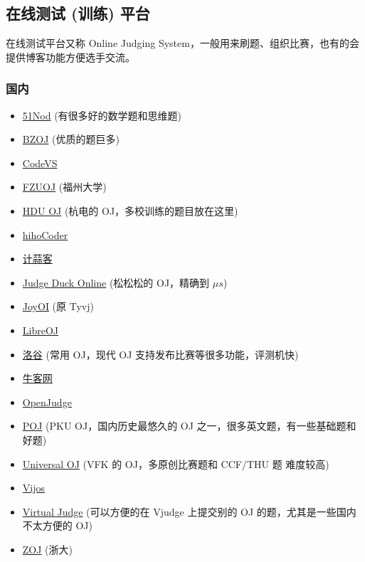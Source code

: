 
\subsection{在线测试 (训练) 平台}

在线测试平台又称 Online Judging System，一般用来刷题、组织比赛，也有的会提供博客功能方便选手交流。

\subsubsection{国内}

\begin{itemize}
\item \href{https://www.51nod.com/}{51Nod} (有很多好的数学题和思维题)
\item \href{https://www.lydsy.com/JudgeOnline/}{BZOJ} (优质的题巨多)
\item \href{http://www.codevs.cn/}{CodeVS}
\item \href{http://acm.fzu.edu.cn/}{FZUOJ} (福州大学)
\item \href{http://acm.hdu.edu.cn/}{HDU OJ} (杭电的 OJ，多校训练的题目放在这里)
\item \href{https://hihocoder.com/}{hihoCoder}
\item \href{https://www.jisuanke.com/}{计蒜客}
\item \href{https://duck.ac/}{Judge Duck Online} (松松松的 OJ，精确到 $\mu s$)
\item \href{http://www.joyoi.cn/}{JoyOI} (原 Tyvj)
\item \href{https://loj.ac/}{LibreOJ}
\item \href{http://www.luogu.org/}{洛谷} (常用 OJ，现代 OJ 支持发布比赛等很多功能，评测机快)
\item \href{https://www.nowcoder.com/}{牛客网}
\item \href{http://openjudge.cn/}{OpenJudge}
\item \href{http://poj.org/}{POJ} (PKU OJ，国内历史最悠久的 OJ 之一，很多英文题，有一些基础题和好题)
\item \href{http://uoj.ac/}{Universal OJ} (VFK 的 OJ，多原创比赛题和 CCF/THU 题 难度较高)
\item \href{https://vijos.org/}{Vijos}
\item \href{https://vjudge.net/}{Virtual Judge} (可以方便的在 Vjudge 上提交别的 OJ 的题，尤其是一些国内不太方便的 OJ)
\item \href{http://acm.zju.edu.cn/onlinejudge/}{ZOJ} (浙大)
\end{itemize}

